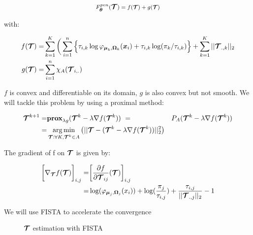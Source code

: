 \begin{equation}
F^{pen}_{{\boldsymbol\theta}}(\boldsymbol{\mathcal T})={\large f}({\footnotesize
\boldsymbol{\mathcal T}})+ {\large g}({\footnotesize
\boldsymbol{\mathcal T}})
\end{equation}

with:

\begin{align*}
f(\boldsymbol{\mathcal T}) =& 	\sum_{k=1}^K \bigg(\sum_{i=1}^{n} \Big\{\tau_{i,k}\log\varphi_{\boldsymbol\mu_{k},\boldsymbol\Omega_{k}}(\boldsymbol x_i)+\tau_{i,k} \log(\pi_k/\tau_{i,k})\Big\} + \sum_{k=1}^K ||\boldsymbol{\mathcal T}_{.,k}||_{2}\\
g(\boldsymbol{\mathcal T}) =& \sum_{i=1}^{n} \chi_A(\boldsymbol{\mathcal T}_{i,.})
\end{align*}

$f$ is convex and differentiable on its domain, $g$ is also convex but not smooth. We will tackle this problem by using a proximal method:

\begin{align*}
	\boldsymbol{\mathcal T}^{k+1} =& {\bf{prox}}_{\lambda g}(\boldsymbol{\mathcal T}^k - \lambda \nabla f(\boldsymbol{\mathcal T}^k))\
			=& P_A(\boldsymbol{\mathcal T}^k - \lambda \nabla f(\boldsymbol{\mathcal T}^k))\\
			=&\operatorname*{arg\,min}_{ \boldsymbol{\mathcal T} : \forall K, \boldsymbol{\mathcal T}^k \in A}\big( || \boldsymbol{\mathcal T} - (\boldsymbol{\mathcal T}^k - \lambda \nabla f(\boldsymbol{\mathcal T}^k) ) ||^2_2 \big)
\end{align*}

The gradient of f on $\boldsymbol{\mathcal T}$ is given by:

\begin{align*}
\bigg[\nabla_{\boldsymbol{\mathcal T}}f(\boldsymbol{\mathcal T})\bigg]_{i,j} =& \bigg[\frac{\partial f}{\partial \boldsymbol{\mathcal T}_{ij}}(\boldsymbol{\mathcal T}) \bigg]_{i,j}\\
=& \log(\varphi_{\boldsymbol\mu_j,\boldsymbol\Omega_j}(x_i))+\log(\frac{\pi_j}{\tau_{i,j}})+\frac{\tau_{i,j}}{||\boldsymbol{\mathcal T}_{.,j}||_2}-1
\end{align*}

We will use FISTA to accelerate the convergence

\begin{figure}
\begin{center}
   \caption{ $\boldsymbol{\mathcal T}$ estimation with FISTA}
   \label{algo:PEM}
\end{center}
\end{figure}

